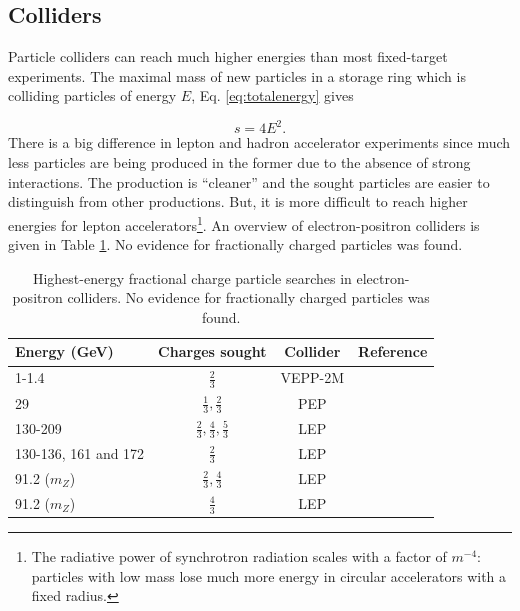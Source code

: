 \subsection{Colliders}
Particle colliders can reach much higher energies than most fixed-target experiments. The maximal mass of new particles in a storage ring which is colliding particles of energy $E$, Eq. \ref{eq:totalenergy} gives

\begin{equation}
s = 4E^2.
\end{equation}
There is a big difference in lepton and hadron accelerator experiments since much less particles are being produced in the former due to the absence of strong interactions. The production is ``cleaner'' and the sought particles are easier to distinguish from other productions. But, it is more difficult to reach higher energies for lepton accelerators\footnote{The radiative power of synchrotron radiation scales with a factor of $m^{-4}$: particles with low mass lose much more energy in circular accelerators with a fixed radius.}. An overview of electron-positron colliders is given in Table \ref{tab:elecposcollider}. No evidence for fractionally charged particles was found.


\begin{table}[]
\caption{Highest-energy fractional charge particle searches in electron-positron colliders. No evidence for fractionally charged particles was found.}
\label{tab:elecposcollider}
\centering
\begin{tabular}{|l|c|c|c|}
\hline
\rowcolor[HTML]{9B9B9B} 
Energy (GeV) & Charges sought                        & Collider &Reference\\ \hline
1-1.4		 & $\frac{2}{3}$						 & VEPP-2M  & \cite{Bondar:1985sb} \\ \hline
29			 & $\frac{1}{3},\frac{2}{3}$			 & PEP & \cite{Aihara:1984px} \\ \hline		
130-209      & $\frac{2}{3},\frac{4}{3},\frac{5}{3}$ & LEP & \cite{Abbiendi:2003yd}    \\ \hline
130-136, 161 and 172 & $\frac{2}{3}$                 & LEP & \cite{Abreu:1996py}    \\ \hline
91.2 ($m_Z$) & $\frac{2}{3},\frac{4}{3}$             & LEP & \cite{Akers:1995az}    \\ \hline
91.2 ($m_Z$) & $\frac{4}{3}$   	    			     & LEP & \cite{Buskulic:1992mr}  \\ \hline
\end{tabular}
\end{table}

